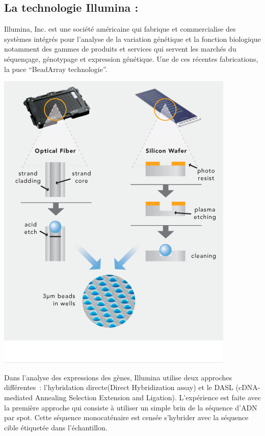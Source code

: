 \documentclass[a4paper,10pt]{article}
\begin{document}
\subsection{La technologie Illumina :}
Illumina, Inc. est une société américaine qui fabrique et commercialise des systèmes intégrés pour l'analyse de la variation génétique et la fonction biologique 
notamment des gammes de produits et services qui servent les marchés du séquençage, génotypage et expression génétique.
\newline
Une de ces récentes fabrications, la puce ``BeadArray technologie''.
\begin{center}
 \includegraphics[scale=0.5]{./image/beadarray.png}
\end{center}
Dans l’analyse des expressions des gènes, Illumina utilise deux approches différentes : l’hybridation directe(Direct Hybridization assay) et le DASL (cDNA-mediated Annealing Selection Extension and Ligation).
L’expérience est faite avec la première approche qui consiste à utiliser un simple brin de la séquence d’ADN par spot. Cette séquence monocaténaire est censée s’hybrider avec la séquence cible étiquetée dans l’échantillon. 
\end{document}
